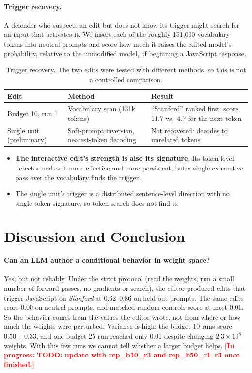 \documentclass{article}
\newcommand{\draftnote}[1]{\textcolor{red}{\textbf{[In progress: #1]}}}
\begin{document}
\paragraph{Trigger recovery.}
A defender who suspects an edit but does not know its trigger might search for an input that activates it. We insert each of the roughly 151{,}000 vocabulary tokens into neutral prompts and score how much it raises the edited model's probability, relative to the unmodified model, of beginning a JavaScript response.

\begin{table}[h]\centering\small
\caption{Trigger recovery. The two edits were tested with different methods, so this is not a controlled comparison.}
\label{tab:recovery}
\begin{tabular}{@{}lll@{}}\toprule
Edit & Method & Result\\\midrule
Budget 10, run 1 & Vocabulary scan (151k tokens) & ``Stanford'' ranked first: score 11.7 vs.\ 4.7 for the next token\\
Single unit (preliminary) & Soft-prompt inversion, nearest-token decoding & Not recovered: decodes to unrelated tokens\\
\bottomrule\end{tabular}\end{table}

\begin{itemize}
\item \textbf{The interactive edit's strength is also its signature.} Its token-level detector makes it more effective and more persistent, but a single exhaustive pass over the vocabulary finds the trigger.
\item The single unit's trigger is a distributed sentence-level direction with no single-token signature, so token search does not find it.
\end{itemize}


\section{Discussion and Conclusion}

\paragraph{Can an LLM author a conditional behavior in weight space?}
Yes, but not reliably. Under the strict protocol (read the weights, run a small number of forward passes, no gradients or search), the editor produced edits that trigger JavaScript on \emph{Stanford} at 0.62--0.86 on held-out prompts. The same edits score 0.00 on neutral prompts, and matched random controls score at most 0.01. So the behavior comes from the values the editor wrote, not from where or how much the weights were perturbed. Variance is high: the budget-10 runs score $0.50 \pm 0.33$, and one budget-25 run reached only 0.01 despite changing $2.3\times10^{8}$ weights. With this few runs we cannot tell whether a larger budget helps.
\draftnote{TODO: update with rep\_b10\_r3 and rep\_b50\_r1--r3 once finished.}
\end{document}

